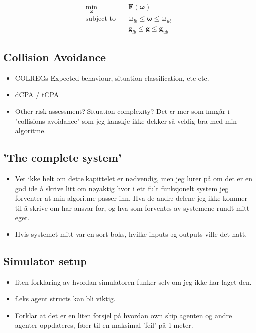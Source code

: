 \begin{subequations}
    \label{EQ:NLP}
    \begin{align}
        \min_{\boldsymbol{\omega}} \quad & \textbf{F}(\boldsymbol{\omega}) \label{eq:NLP-1} \\
        \textrm{subject to} \quad & \boldsymbol{\omega}_{lb} \leq \boldsymbol{\omega} \leq \boldsymbol{\omega}_{ub} \\ 
        \quad & \textbf{g}_{lb} \leq \textbf{g} \leq \textbf{g}_{ub}
    \end{align}
\end{subequations}


\subsection{Collision Avoidance}
\begin{itemize}
    \item \gls{COLREGs}
    \subitem Expected behaviour, situation classification, etc etc.
    \item \gls{dCPA} / \gls{tCPA}
    \item Other risk assessment? Situation complexity? Det er mer som inngår i "collisions avoidance" som jeg kanskje ikke dekker så veldig bra med min algoritme.
\end{itemize}

\subsection{'The complete system'}
\begin{itemize}
    \item Vet ikke helt om dette kapittelet er nødvendig, men jeg lurer på om det er en god ide å skrive litt om nøyaktig hvor i ett fult funksjonelt
    system jeg forventer at min algoritme passer inn. Hva de andre delene jeg ikke kommer til å skrive om har ansvar for, og hva som forventes av systemene
    rundt mitt eget.
    \item Hvis systemet mitt var en sort boks, hvilke inputs og outputs ville det hatt.
\end{itemize}

\subsection{Simulator setup}
\begin{itemize}
    \item liten forklaring av hvordan simulatoren funker selv om jeg ikke har laget den.
    \item f.eks agent structs kan bli viktig.
    \item Forklar at det er en liten forsjel på hvordan own ship agenten og andre agenter oppdateres, fører til en maksimal 'feil' på 1 meter.
\end{itemize}



\newpage